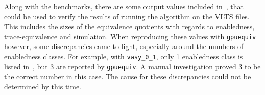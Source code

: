 Along with the benchmarks, there are some output values included
in~\cite{bisping2023process},
that could be used to verify the results of running the algorithm on the VLTS
files.
This includes the sizes of the equivalence quotients with regards to
enabledness, trace-equivalence and simulation.
When reproducing these values with \texttt{gpuequiv} however,
some discrepancies came to light,
especially around the numbers of enabledness classes.
For example, with \texttt{vasy\_0\_1}, only 1 enabledness class is listed
in~\cite{bisping2023process},
but 3 are reported by \texttt{gpuequiv}.
A manual investigation proved 3 to be the correct number in this case.
The cause for these discrepancies could not be determined by this time.
